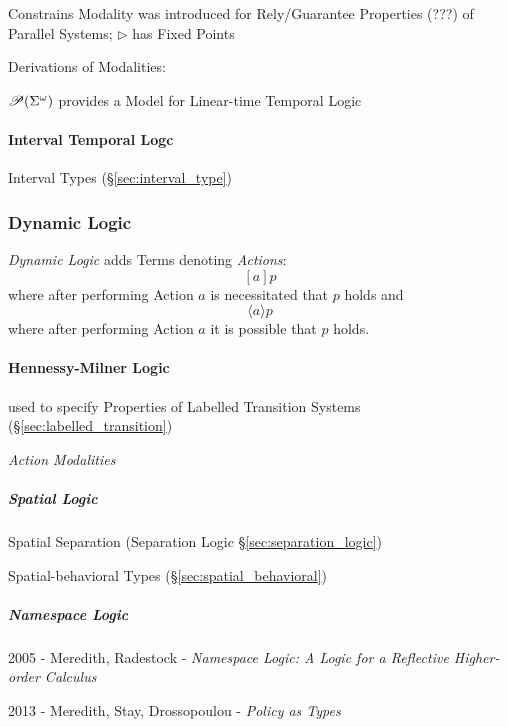 Constrains Modality was introduced for Rely/Guarantee Properties (???)
of Parallel Systems; $\rhd$ has Fixed Points

Derivations of Modalities: %

$\mathscr{P}(\Sigma^\omega)$ provides a Model for Linear-time Temporal Logic
\cite{abramsky-gay-nagarajan96}



\paragraph{Interval Temporal Logc}\label{sec:interval_temporal}\hfill

Interval Types (\S\ref{sec:interval_type})



\subsubsection{Dynamic Logic}\label{sec:dynamic_logic}

\emph{Dynamic Logic} adds Terms denoting \emph{Actions}:
\[
  [a]p
\]
where after performing Action $a$ is necessitated that $p$ holds and
\[
  \langle a \rangle p
\]
where after performing Action $a$ it is possible that $p$ holds.



\paragraph{Hennessy-Milner Logic}\label{sec:hennessy_milner}
\hfill

used to specify Properties of Labelled Transition Systems
(\S\ref{sec:labelled_transition})

\emph{Action Modalities}



\subparagraph{Spatial Logic}\label{sec:spatial_logic}
\hfill

Spatial Separation (Separation Logic \S\ref{sec:separation_logic})

Spatial-behavioral Types (\S\ref{sec:spatial_behavioral})



\subparagraph{Namespace Logic}\label{sec:namespace_logic}
\hfill

2005 - Meredith, Radestock - \emph{Namespace Logic: A Logic for a Reflective
  Higher-order Calculus}

2013 - Meredith, Stay, Drossopoulou - \emph{Policy as Types}

